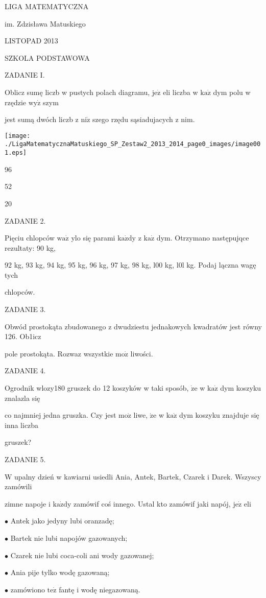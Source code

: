\documentclass[a4paper,12pt]{article}
\begin{document}
LIGA MATEMATYCZNA

im. Zdzisława Matuskiego

LISTOPAD 2013

SZKOLA PODSTAWOWA

ZADANIE I.

Oblicz sumę liczb w pustych polach diagramu, $\mathrm{j}\mathrm{e}\dot{\mathrm{z}}$ eli liczba w $\mathrm{k}\mathrm{a}\dot{\mathrm{z}}$ dym polu w rzędzie $\mathrm{w}\mathrm{y}\dot{\mathrm{z}}$ szym

jest sumą dwóch liczb z $\mathrm{n}\mathrm{i}\dot{\mathrm{z}}$ szego rzędu sąsiadujacych z nim.
\begin{center}
\texttt{[image: ./LigaMatematycznaMatuskiego\_SP\_Zestaw2\_2013\_2014\_page0\_images/image001.eps]}
\end{center}
96

52

20

ZADANIE 2.

Pięciu chlopców $\mathrm{w}\mathrm{a}\dot{\mathrm{z}}$ ylo się parami $\mathrm{k}\mathrm{a}\dot{\mathrm{z}}\mathrm{d}\mathrm{y}$ z $\mathrm{k}\mathrm{a}\dot{\mathrm{z}}$ dym. Otrzymano następujqce rezultaty: 90 kg,

92 kg, 93 kg, 94 kg, 95 kg, 96 kg, 97 kg, 98 kg, l00 kg, l0l kg. Podaj lączna wagę tych

chlopców.

ZADANIE 3.

Obwód prostokąta zbudowanego z dwudziestu jednakowych kwadratów jest równy 126. Ob1icz

pole prostokąta. Rozwaz wszystkie $\mathrm{m}\mathrm{o}\dot{\mathrm{z}}$ liwości.

ZADANIE 4.

Ogrodnik wlozy180 gruszek do 12 koszyków w taki sposób, $\dot{\mathrm{z}}\mathrm{e}$ w $\mathrm{k}\mathrm{a}\dot{\mathrm{z}}$ dym koszyku znalazla się

co najmniej jedna gruszka. Czy jest $\mathrm{m}\mathrm{o}\dot{\mathrm{z}}$ liwe, $\dot{\mathrm{z}}\mathrm{e}$ w $\mathrm{k}\mathrm{a}\dot{\mathrm{z}}$ dym koszyku znajduje się inna liczba

gruszek?

ZADANIE 5.

$\mathrm{W}$ upalny dzień w kawiarni usiedli Ania, Antek, Bartek, Czarek i Darek. Wszyscy zamówili

zimne napoje i $\mathrm{k}\mathrm{a}\dot{\mathrm{z}}\mathrm{d}\mathrm{y}$ zamówif coś innego. Ustal kto zamówif jaki napój, $\mathrm{j}\mathrm{e}\dot{\mathrm{z}}$ eli

$\bullet$ Antek jako jedyny lubi oranzadę;

$\bullet$ Bartek nie lubi napojów gazowanych;

$\bullet$ Czarek nie lubi coca-coli ani wody gazowanej;

$\bullet$ Ania pije tylko wodę gazowaną;

$\bullet$ zamówiono $\mathrm{t}\mathrm{e}\dot{\mathrm{z}}$ fantę i wodę niegazowaną.
\end{document}
